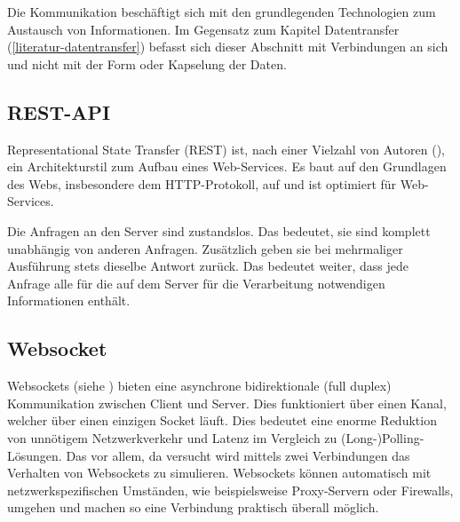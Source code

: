 
Die Kommunikation beschäftigt sich mit den grundlegenden Technologien zum Austausch von Informationen. Im Gegensatz zum Kapitel Datentransfer (\autoref{literatur-datentransfer}) befasst sich dieser Abschnitt mit Verbindungen an sich und nicht mit der Form oder Kapselung der Daten.



\subsection{REST-API}


Representational State Transfer (REST) ist, nach einer Vielzahl von Autoren (\cite{Fielding17:online, WebServi33:online, richardson2008restful}), ein Architekturstil zum Aufbau eines Web-Services. Es baut auf den Grundlagen des Webs, insbesondere dem HTTP-Protokoll, auf und ist optimiert für Web-Services. 


Die Anfragen an den Server sind zustandslos. Das bedeutet, sie sind komplett unabhängig von anderen Anfragen. Zusätzlich geben sie bei mehrmaliger Ausführung stets dieselbe Antwort zurück. Das bedeutet weiter, dass jede Anfrage alle für die auf dem Server für die Verarbeitung notwendigen Informationen enthält.




\subsection{Websocket}


Websockets (siehe \cite{AboutHTM97:online, RFC6455T98:online}) bieten eine asynchrone bidirektionale (full duplex) Kommunikation zwischen Client und Server. Dies funktioniert über einen Kanal, welcher über einen einzigen Socket läuft. Dies bedeutet eine enorme Reduktion von un\-nöt\-igem Netzwerkverkehr und Latenz im Vergleich zu (Long-)Polling-Lösungen. Das vor allem, da versucht wird mittels zwei Verbindungen das Verhalten von Websockets zu simulieren. Websockets können automatisch mit netzwerkspezifischen Umständen, wie beispielsweise Pro\-xy-\-Ser\-vern oder Firewalls, umgehen und machen so eine Verbindung praktisch überall möglich.


